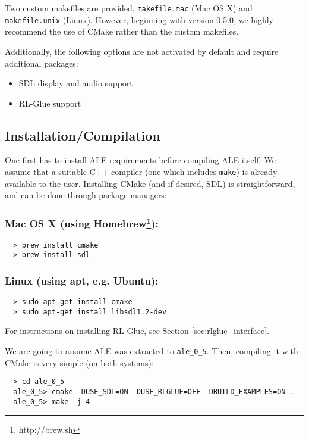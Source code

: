 \documentclass[12pt]{article}
\begin{document}
Two custom makefiles are provided, \verb+makefile.mac+ (Mac OS X) and \verb+makefile.unix+ (Linux). However, beginning with version 0.5.0, we highly recommend the use of CMake rather than the custom makefiles.

Additionally, the following options are not activated by default and require additional packages:
\begin{itemize}
  \item SDL display and audio support
  \item RL-Glue support
\end{itemize}

\subsection{Installation/Compilation}\label{subsec:installation_compilation}

One first has to install ALE requirements before compiling ALE itself. 
We assume that a suitable C++ compiler (one which includes \verb+make+) is already available to 
the user. Installing CMake (and if desired, SDL) is straightforward, and can be done through 
package managers: 

\subsubsection*{Mac OS X (using Homebrew\footnote{http://brew.sh}):}
\begin{verbatim}
  > brew install cmake
  > brew install sdl
\end{verbatim}

\subsubsection*{Linux (using apt, e.g. Ubuntu):}
\begin{verbatim}
  > sudo apt-get install cmake
  > sudo apt-get install libsdl1.2-dev
\end{verbatim}

For instructions on installing RL-Glue, see Section \ref{sec:rlglue_interface}.

We are going to assume ALE was extracted to \verb+ale_0_5+. Then, compiling it
with CMake is very simple (on both systems):
\begin{verbatim}
  > cd ale_0_5
  ale_0_5> cmake -DUSE_SDL=ON -DUSE_RLGLUE=OFF -DBUILD_EXAMPLES=ON .
  ale_0_5> make -j 4
\end{verbatim}
\end{document}
